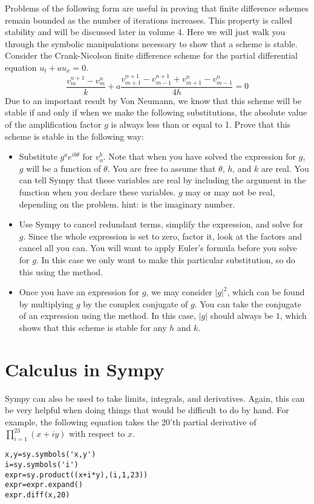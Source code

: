 \begin{problem}
Problems of the following form are useful in proving that finite difference schemes remain bounded as the number of iterations increases.
This property is called stability and will be discussed later in volume 4.
Here we will just walk you through the symbolic manipulations necessary to show that a scheme is stable.
Consider the Crank-Nicolson finite difference scheme for the partial differential equation $u_t+a u_x=0$.
$$\frac{v_{m}^{n+1}-v_{m}^{n}}{k}+a \frac{v_{m+1}^{n+1}-v_{m-1}^{n+1}+v_{m+1}^{n}-v_{m-1}^{n}}{4h}=0$$
Due to an important result by Von Neumann, we know that this scheme will be stable if and only if when we make the following substitutions, the absolute value of the amplification factor $g$ is always less than or equal to 1.
Prove that this scheme is stable in the following way:
\begin{itemize}
\item Substitute $g^a e^{i b \theta}$ for $v_a^b$.
Note that when you have solved the expression for $g$, $g$ will be a function of $\theta$.
You are free to assume that $\theta$, $h$, and $k$ are real.
You can tell Sympy that these variables are real by including the argument  in the  function when you declare these variables.
$g$ may or may not be real, depending on the problem.
hint:  is the imaginary number.
\item Use Sympy to cancel redundant terms, simplify the expression, and solve for $g$.
Since the whole expression is set to zero, factor it, look at the factors and cancel all you can.
You will want to apply Euler's formula before you solve for $g$.
In this case we only want to make this particular substitution, so do this using the  method.
\item Once you have an expression for $g$, we may consider $|g|^2$, which can be found by multiplying $g$ by the complex conjugate of $g$. 
You can take the conjugate of an expression using the  method.
In this case, $|g|$ should always be $1$, which shows that this scheme is stable for any $h$ and $k$.
\end{itemize}
\end{problem}

\section*{Calculus in Sympy}
Sympy can also be used to take limits, integrals, and derivatives.
Again, this can be very helpful when doing things that would be difficult to do by hand.
For example, the following equation takes the 20'th partial derivative of $\displaystyle{\prod_{i=1}^{23} \left(x+i y\right)}$ with respect to $x$.
\begin{lstlisting}
x,y=sy.symbols('x,y')
i=sy.symbols('i')
expr=sy.product((x+i*y),(i,1,23))
expr=expr.expand()
expr.diff(x,20)
\end{lstlisting}

